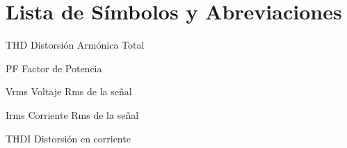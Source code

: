 



\renewcommand{\tablename}{\textbf{Tabla}}
\renewcommand{\figurename}{\textbf{Figura}}
\renewcommand{\listtablename}{Lista de Tablas}
\renewcommand{\listfigurename}{Lista de Figuras}
\renewcommand{\contentsname}{Contenido}


\newpage{\cleardoublepage}
\listoffigures

\newpage{\cleardoublepage}
\listoftables


\newpage{\cleardoublepage}
\chapter*{Lista de Símbolos y Abreviaciones}

\begin{abbrv}
\item[THD]		Distorsión Armónica Total
\item[PF]		Factor de Potencia
\item[Vrms]		Voltaje Rms de la señal
\item[Irms]		Corriente Rms de la señal
\item[THDI]		Distorsión en corriente
\end{abbrv}



\newpage{\cleardoublepage}
\tableofcontents

\newpage{\cleardoublepage}
%
\setcounter{page}{2}


%
%
%
%
\newpage{\cleardoublepage}

\nocite{*} 

\newpage{\cleardoublepage}

